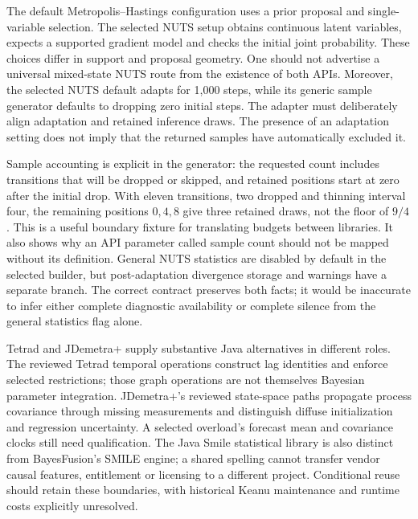 The default Metropolis--Hastings configuration uses a prior proposal and single-variable selection. The selected NUTS setup obtains continuous latent variables, expects a supported gradient model and checks the initial joint probability. These choices differ in support and proposal geometry. One should not advertise a universal mixed-state NUTS route from the existence of both APIs. Moreover, the selected NUTS default adapts for 1,000 steps, while its generic sample generator defaults to dropping zero initial steps. The adapter must deliberately align adaptation and retained inference draws. The presence of an adaptation setting does not imply that the returned samples have automatically excluded it.~\citep{exec25_bsw_keanu}

Sample accounting is explicit in the generator: the requested count includes transitions that will be dropped or skipped, and retained positions start at zero after the initial drop. With eleven transitions, two dropped and thinning interval four, the remaining positions $0,4,8$ give three retained draws, not the floor of $9/4$. This is a useful boundary fixture for translating budgets between libraries. It also shows why an API parameter called sample count should not be mapped without its definition. General NUTS statistics are disabled by default in the selected builder, but post-adaptation divergence storage and warnings have a separate branch. The correct contract preserves both facts; it would be inaccurate to infer either complete diagnostic availability or complete silence from the general statistics flag alone.~\citep{exec25_bsw_keanu,exec25_bsw_choice}

Tetrad and JDemetra+ supply substantive Java alternatives in different roles. The reviewed Tetrad temporal operations construct lag identities and enforce selected restrictions; those graph operations are not themselves Bayesian parameter integration. JDemetra+'s reviewed state-space paths propagate process covariance through missing measurements and distinguish diffuse initialization and regression uncertainty. A selected overload's forecast mean and covariance clocks still need qualification. The Java Smile statistical library is also distinct from BayesFusion's SMILE engine; a shared spelling cannot transfer vendor causal features, entitlement or licensing to a different project. Conditional reuse should retain these boundaries, with historical Keanu maintenance and runtime costs explicitly unresolved.~\citep{exec25_jdyn_tetrad,exec25_jdyn_jdplus,exec25_jdyn_choice,exec24_smile_choice,exec25_bsw_choice}

